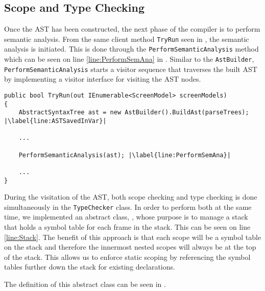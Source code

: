 \subsection*{Scope and Type Checking} \label{sec:TypeChecker}
Once the AST has been constructed, the next phase of the compiler is to perform semantic analysis. From the same client method \texttt{TryRun} seen in , the semantic analysis is initiated. This is done through the \texttt{PerformSemanticAnalysis} method which can be seen on line \ref{line:PerformSemAna} in .
Similar to the \texttt{AstBuilder}, \texttt{PerformSemanticAnalysis} starts a visitor sequence that traverses the built AST by implementing a visitor interface for visiting the AST nodes.

\begin{lstlisting}[language=CSharp, caption={The \texttt{TryRun} method that serves as a client inside the \texttt{DazelCompiler} class.}, label={lst:RunMethodSecond},escapechar=|]
public bool TryRun(out IEnumerable<ScreenModel> screenModels)
{
    AbstractSyntaxTree ast = new AstBuilder().BuildAst(parseTrees); |\label{line:ASTSavedInVar}|

    ...
    
    PerformSemanticAnalysis(ast); |\label{line:PerformSemAna}|

    ...
}
\end{lstlisting}

During the visitation of the AST, both scope checking and type checking is done simultaneously in the \texttt{TypeChecker} class. 
In order to perform both at the same time, we implemented an abstract class, \abstractsemanticclass{}, whose purpose is to manage a stack that holds a symbol table for each frame in the stack. This can be seen on line \ref{line:Stack}. The benefit of this approach is that each scope will be a symbol table on the stack and therefore the innermost nested scopes will always be at the top of the stack. This allows us to enforce static scoping by referencing the symbol tables further down the stack for existing declarations.

The definition of this abstract class can be seen in .

